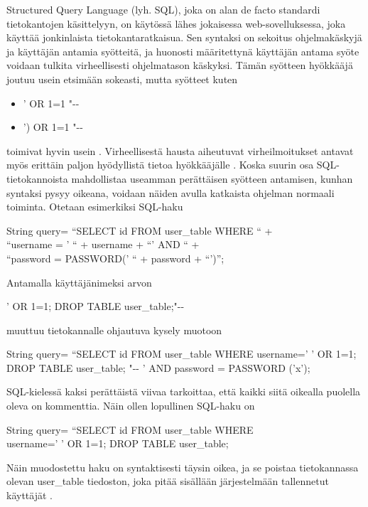 Structured Query Language (lyh. SQL), joka on alan de facto standardi tietokantojen käsittelyyn, on käytössä lähes jokaisessa
web-sovelluksessa, joka käyttää jonkinlaista tietokantaratkaisua. Sen syntaksi on sekoitus ohjelmakäskyjä ja käyttäjän antamia
syötteitä, ja huonosti määritettynä käyttäjän antama syöte voidaan tulkita virheellisesti ohjelmatason käskyksi. Tämän syötteen
hyökkääjä joutuu usein etsimään sokeasti, mutta syötteet kuten

\begin{itemize}
\item ' OR 1=1 "{-}{-}
\item ') OR 1=1 "{-}{-}
\end {itemize}
toimivat hyvin usein \cite{WEB2}. Virheellisestä hausta aiheutuvat virheilmoitukset antavat myös erittäin paljon
hyödyllistä tietoa hyökkääjälle \cite{SQLSS}. Koska suurin osa SQL-tietokannoista mahdollistaa useamman perättäisen syötteen 
antamisen, kunhan syntaksi pysyy oikeana, voidaan näiden avulla katkaista ohjelman normaali toiminta. Otetaan esimerkiksi SQL-haku
\begin{tt}
\begin{center}
String query= ``SELECT id FROM user\_table WHERE `` + \\
``username = ' `` + username + ``' AND `` + \\
``password = PASSWORD(' `` + password + ``')''; \\
\end{center}
\end{tt}
Antamalla käyttäjänimeksi arvon

\begin{tt}
\begin{center}
' OR 1=1; DROP TABLE user\_table;"{-}{-}
\end{center}
\end{tt}
muuttuu tietokannalle ohjautuva kysely muotoon

\begin{tt}
\begin{center}
String query= ``SELECT id FROM user\_table WHERE username=' ' OR 1=1; DROP TABLE
user\_table; "{-}{-} ' AND password = PASSWORD ('x');
\end{center}
\end{tt}
SQL-kielessä kaksi perättäistä viivaa tarkoittaa, että kaikki siitä oikealla puolella oleva on kommenttia. 
Näin ollen lopullinen SQL-haku on 

\begin{tt}
\begin{center}
String query= ``SELECT id FROM user\_table WHERE \\username=' ' OR 1=1; DROP TABLE
user\_table;
\end{center}
\end{tt}
Näin muodostettu haku on syntaktisesti täysin oikea, ja se poistaa tietokannassa olevan user\_table tiedoston, joka pitää
sisällään järjestelmään tallennetut käyttäjät \cite{WEB2}. 

